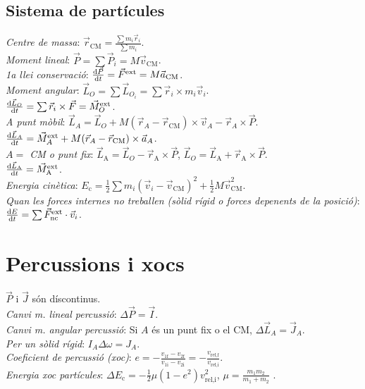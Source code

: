 \documentclass[10pt]{article}
\newcommand{\lp}{\left(}
\newcommand{\rp}{\right)}
\newcommand{\ci}{\textbullet\;}
\begin{document}
\begin{multicols}{3}
\subsection{Sistema de part\'icules}
\emph{Centre de massa}: $\vec{r}_{\text{CM}} = \frac{\sum m_i \vec{r}_i}{\sum m_i}$. \\
\emph{Moment lineal}: $\vec{P} = \sum \vec{P}_i = M\vec{v}_{\text{CM}}$. \\
\emph{1a llei conservaci\'o}: $\frac{\dif \vec{P}}{\dif t} = \vec{F}^{\text{ext}} = 
  M \vec{a}_\text{CM}$. \\
\emph{Moment angular}: $\vec{L}_O = \sum \vec{L}_{O_i} = \sum \vec{r}_i \times m_i\vec{v}_i$. \\
\ci $\frac{\dif \vec{L}_O}{\dif t} = \sum \vec{r}_i\times\vec{F} = \vec{M}_O^{\text{ext}}$. \\
\emph{A punt m\`obil}: $\vec{L}_A = \vec{L}_O + M(\vec{r}_A - \vec{r}_{\text{CM}}) \times \vec{v}_A - \vec{r}_A\times\vec{P}$. \\
\ci $\frac{\dif \vec{L}_A}{\dif t} = \vec{M}_A^{\text{ext}} + M(\vec{r}_A - \vec{r}_{\text{CM}})\times \vec{a}_A$. \\
\emph{$A =$ CM o punt fix}: $\vec{L}_{\text{A}} = \vec{L}_O - \vec{r}_{\text{A}}\times\vec{P}$, $\vec{L}_O = \vec{L}_{\text{A}} + \vec{r}_{\text{A}}\times\vec{P}$. \\
\ci $\frac{\dif \vec{L}_{\text{A}}}{\dif t} = \vec{M}_{\text{A}}^{\text{ext}}$. \\
\emph{Energia cinètica}: $E_{\text{c}} = \frac{1}{2} \sum m_i (\vec{v}_i - \vec{v}_{\text{CM}})^2 + \frac{1}{2}  M\vec{v}_{\text{CM}}^2$.\\
\emph{Quan les forces internes no treballen (sòlid rígid o forces depenents de la posició)}: $\frac{\dif E}{\dif t}  =\sum \vec{F}^{\text{ext}}_\text{nc}\cdot\vec{v}_i$. \\

\section{Percussions i xocs}
$\vec{P}$ i $\vec{J}$ són díscontinus.\\
\emph{Canvi m. lineal percussió}: $\Delta \vec{P} = \vec{I}$.\\
\emph{Canvi m. angular percussió}: Si $A$ és un punt fix o el CM, $\Delta \vec{L}_A = \vec{J}_A$.\\
\emph{Per un sòlid rígid}: $I_A \Delta \omega = J_A$.\\
\emph{Coeficient de percussió (xoc)}: $e = - \frac{v_{1\text{f}} - v_{2\text{f}}}{v_{1\text{i}} - v_{2\text{i}}}=-\frac{v_{\text{rel,f}}}{v_{\text{rel,i}}}$.\\
\emph{Energia xoc partícules}: $\Delta E_\text{c} = -\frac{1}{2} \mu \lp 1 - e^2 \rp v_\text{rel,i}^2$, $\mu=\frac{m_1m_2}{m_1+m_2}$ .\\




\end{multicols}
\end{document}

